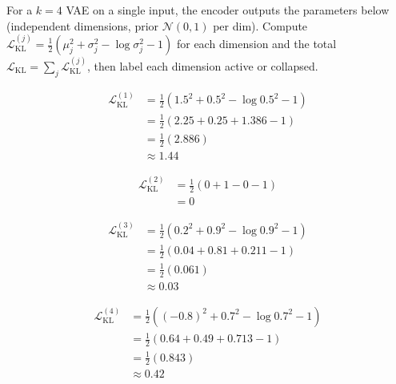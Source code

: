 \vspace{2.5em}


For a $k{=}4$ VAE on a single input, the encoder outputs the parameters below (independent dimensions, prior $\mathcal{N}(0, 1)$ per dim).
Compute $\mathcal{L}_{\text{KL}}^{(j)} = \tfrac{1}{2}(\mu_j^2 + \sigma_j^2 - \log \sigma_j^2 - 1)$ for each dimension and the total $\mathcal{L}_{\text{KL}} = \sum_j \mathcal{L}_{\text{KL}}^{(j)}$, then label each dimension active or collapsed.

\begin{align*}
    \mathcal{L}_{\text{KL}}^{(1)} &= \tfrac{1}{2}(1.5^2 + 0.5^2 - \log 0.5^2 - 1) \\
                                  &= \tfrac{1}{2}(2.25 + 0.25 + 1.386 - 1) \\
                                  &= \tfrac{1}{2}(2.886) \\
                                  &\approx 1.44
\end{align*}

\begin{align*}
    \mathcal{L}_{\text{KL}}^{(2)} &= \tfrac{1}{2}(0 + 1 - 0 - 1) \\
                                  &= 0
\end{align*}

\begin{align*}
    \mathcal{L}_{\text{KL}}^{(3)} &= \tfrac{1}{2}(0.2^2 + 0.9^2 - \log 0.9^2 - 1) \\
                                  &= \tfrac{1}{2}(0.04 + 0.81 + 0.211 - 1) \\
                                  &= \tfrac{1}{2}(0.061) \\
                                  &\approx 0.03
\end{align*}

\begin{align*}
    \mathcal{L}_{\text{KL}}^{(4)} &= \tfrac{1}{2}((-0.8)^2 + 0.7^2 - \log 0.7^2 - 1) \\
                                  &= \tfrac{1}{2}(0.64 + 0.49 + 0.713 - 1) \\
                                  &= \tfrac{1}{2}(0.843) \\
                                  &\approx 0.42
\end{align*}


